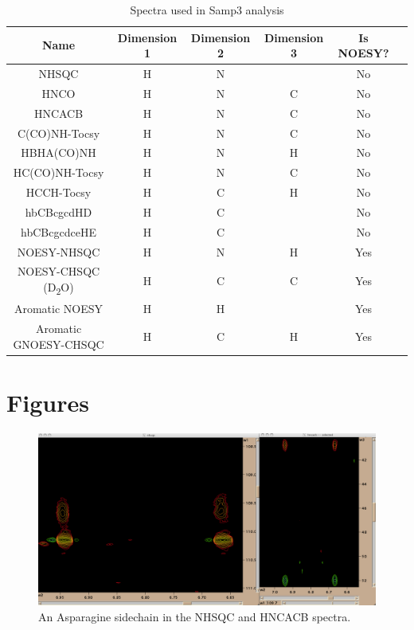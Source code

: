 \begin{table}[h]
    \begin{tabular}{ | c || c | c | c | c | c |}
    \hline
      Name  &  Dimension 1  &  Dimension 2  &  Dimension 3  &  Is NOESY?   \\
    \hline
      NHSQC         & H & N & & No  \\
    \hline
      HNCO          & H & N & C & No  \\
    \hline
      HNCACB        & H & N & C & No  \\
    \hline
      C(CO)NH-Tocsy & H & N & C & No  \\
    \hline
      HBHA(CO)NH    & H & N & H & No  \\
    \hline
      HC(CO)NH-Tocsy & H & N & C & No  \\
    \hline
      HCCH-Tocsy    & H & C & H & No  \\
    \hline
      hbCBcgcdHD    & H & C &  & No  \\
    \hline 
      hbCBcgcdceHE  & H & C &  & No \\
    \hline
      NOESY-NHSQC   & H & N & H & Yes \\
    \hline 
      NOESY-CHSQC (D\textsubscript{2}O) & H & C & C & Yes \\
    \hline 
      Aromatic NOESY & H & H &  & Yes \\
    \hline 
      Aromatic GNOESY-CHSQC & H & C & H & Yes \\
    \hline 
    \end{tabular}
    \caption{Spectra used in Samp3 analysis}
    \label{samp3_spectra}
\end{table}


\clearpage
\section{Figures}

\begin{figure}[h]
  \includegraphics[scale=0.4]{figures/asn_sidechain}
  \caption{An Asparagine sidechain in the NHSQC and HNCACB spectra.}
  \label{asn_sidechain}
\end{figure}

